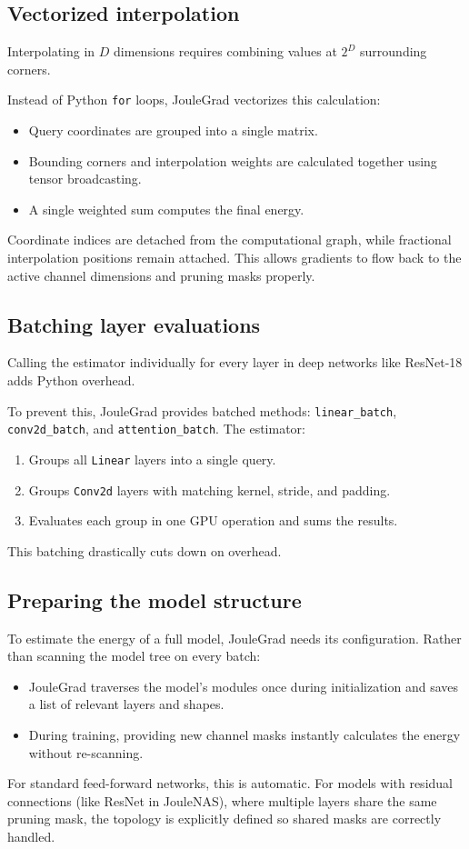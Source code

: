 \subsection{Vectorized interpolation}

Interpolating in $D$ dimensions requires combining values at $2^D$ surrounding corners. 

Instead of Python \texttt{for} loops, JouleGrad vectorizes this calculation:
\begin{itemize}
    \item Query coordinates are grouped into a single matrix.
    \item Bounding corners and interpolation weights are calculated together using tensor broadcasting.
    \item A single weighted sum computes the final energy.
\end{itemize}
Coordinate indices are detached from the computational graph, while fractional interpolation positions remain attached. This allows gradients to flow back to the active channel dimensions and pruning masks properly.

\subsection{Batching layer evaluations}

Calling the estimator individually for every layer in deep networks like ResNet-18 adds Python overhead. 

To prevent this, JouleGrad provides batched methods: \texttt{linear\_batch}, \texttt{conv2d\_batch}, and \texttt{attention\_batch}. The estimator:
\begin{enumerate}
    \item Groups all \texttt{Linear} layers into a single query.
    \item Groups \texttt{Conv2d} layers with matching kernel, stride, and padding.
    \item Evaluates each group in one GPU operation and sums the results.
\end{enumerate}
This batching drastically cuts down on overhead.

\subsection{Preparing the model structure}

To estimate the energy of a full model, JouleGrad needs its configuration. Rather than scanning the model tree on every batch:
\begin{itemize}
    \item JouleGrad traverses the model's modules once during initialization and saves a list of relevant layers and shapes.
    \item During training, providing new channel masks instantly calculates the energy without re-scanning.
\end{itemize}
For standard feed-forward networks, this is automatic. For models with residual connections (like ResNet in JouleNAS), where multiple layers share the same pruning mask, the topology is explicitly defined so shared masks are correctly handled.

